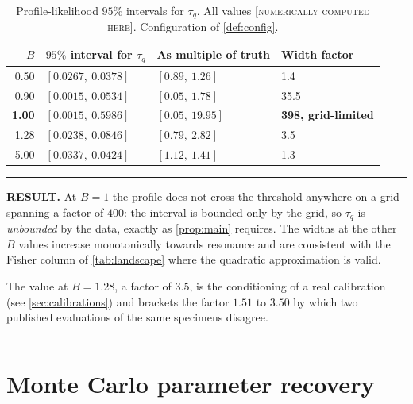 \documentclass[11pt,a4paper]{article}
\theoremstyle{definition}
\newenvironment{resultbox}%
  {\par\medskip\noindent\begin{minipage}{\linewidth}%
   \rule{\linewidth}{1.0pt}\par\noindent\textbf{RESULT.}\enspace}%
  {\par\rule{\linewidth}{1.0pt}\end{minipage}\par\medskip}
\newcommand{\NUM}{\textcolor{red!55!black}{\footnotesize[\textsc{numerically computed here}]}}
\newcommand{\tq}{\tau_{q}}
\newcommand{\Bnum}{B}
\begin{document}
\begin{table}[H]
\centering
\caption{Profile-likelihood $95\%$ intervals for $\tq$. All values \NUM.
         Configuration of \cref{def:config}.}
\label{tab:profile}
\small
\begin{tabular}{@{}rlll@{}}
\toprule
$\Bnum$ & $95\%$ interval for $\tq$ &
As multiple of truth & Width factor \\
\midrule
0.50 & $[0.0267,\ 0.0378]$ & $[0.89,\ 1.26]$  & 1.4 \\
0.90 & $[0.0015,\ 0.0534]$ & $[0.05,\ 1.78]$  & 35.5 \\
\textbf{1.00} & $[0.0015,\ 0.5986]$ &
  $[0.05,\ 19.95]$ & \textbf{398, grid-limited} \\
1.28 & $[0.0238,\ 0.0846]$ & $[0.79,\ 2.82]$  & 3.5 \\
5.00 & $[0.0337,\ 0.0424]$ & $[1.12,\ 1.41]$  & 1.3 \\
\bottomrule
\end{tabular}
\end{table}

\begin{resultbox}
At $\Bnum=1$ the profile does not cross the threshold anywhere on a grid
spanning a factor of $400$: the interval is bounded only by the grid, so $\tq$
is \emph{unbounded} by the data, exactly as \cref{prop:main} requires. The
widths at the other $\Bnum$ values increase monotonically towards resonance and
are consistent with the Fisher column of \cref{tab:landscape} where the
quadratic approximation is valid.

The value at $\Bnum=1.28$, a factor of $3.5$, is the conditioning of a real
calibration (see \cref{sec:calibrations}) and brackets the factor $1.51$ to
$3.50$ by which two published evaluations of the same specimens disagree.
\end{resultbox}

\section{Monte Carlo parameter recovery}
\label{sec:montecarlo}
\end{document}
